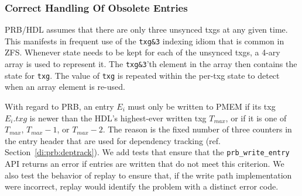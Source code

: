 \documentclass[12pt,a4paper,twoside]{book}
\begin{document}
\subsubsection{Correct Handling Of Obsolete Entries}
PRB/HDL assumes that there are only three unsynced txgs at any given time.
This manifests in frequent use of the \lstinline{txg&3} indexing idiom that is common in ZFS.
Whenever state needs to be kept for each of the unsynced txgs, a 4-ary array is used to represent it.
The \lstinline{txg&3}'th element in the array then contains the state for \lstinline{txg}.
The value of \lstinline{txg} is repeated within the per-txg state to detect when an array element is re-used.

With regard to PRB, an entry $E_i$ must only be written to PMEM if its txg $E_i.txg$ is newer than the HDL's highest-ever written txg $T_{max}$, or if it is one of $T_{max}$, $T_{max}-1$, or $T_{max}-2$.
The reason is the fixed number of three counters in the entry header that are used for dependency tracking (ref. Section~\ref{di:prb:deptrack}).
We add tests that ensure that the \lstinline{prb_write_entry} API returns an error if entries are written that do not meet this criterion.
We also test the behavior of replay to ensure that, if the write path implementation were incorrect, replay would identify the problem with a distinct error code.
\end{document}
